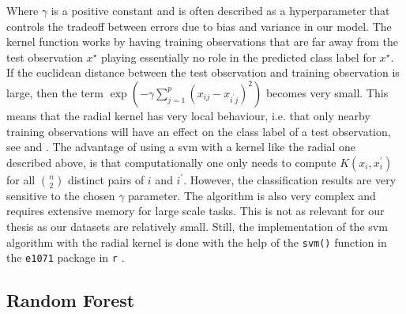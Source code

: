 \documentclass[../thesis.tex]{subfiles}
\begin{document}
\noindent Where $\gamma$ is a positive constant and is often described as a hyperparameter that controls the tradeoff between errors due to bias and variance in our model. The kernel function works by having training observations that are far away from the test observation $x^\star$ playing essentially no role in the predicted class label for $x^\star$. If the euclidean distance between the test observation and training observation is large, then the term $\exp{(-\gamma \sum_{j=1}^p\left(x_{ij} - x_{i^\prime j} \right)^2)}$ becomes very small. This means that the radial kernel has very local behaviour, i.e. that only nearby training observations will have an effect on the class label of a test observation, see \citep{friedman2009elements} and \citep{james2013introduction}. The advantage of using a svm with a kernel like the radial one described above, is that computationally one only needs to compute $K(x_i, x_i^\prime)$ for all $\binom{n}{2}$ distinct pairs of $i$ and $i^\prime$. However, the classification results are very sensitive to the chosen $\gamma$ parameter. The algorithm is also very complex and requires extensive memory for large scale tasks. This is not as relevant for our thesis as our datasets are relatively small. Still, the implementation of the svm algorithm with the radial kernel is done with the help of the \texttt{svm()} function in the \texttt{e1071} package in \texttt{r} \citep{svm}.

\subsection{Random Forest}
\label{subsec:random_forr}
\end{document}
